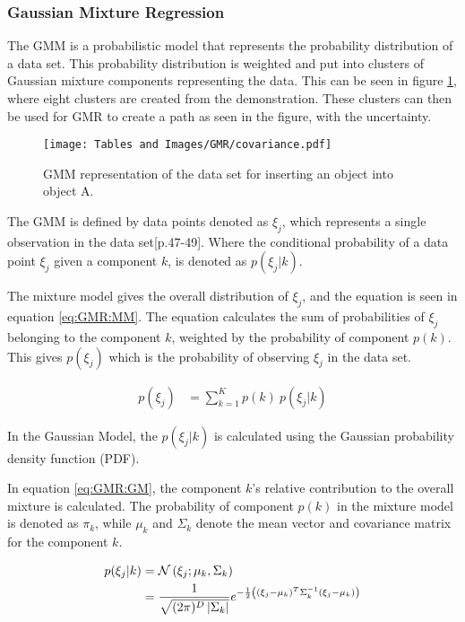 \subsubsection{Gaussian Mixture Regression}\label{sec:GMM}
The GMM is a probabilistic model that represents the probability distribution of a data set.
This probability distribution is weighted and put into clusters of Gaussian mixture components representing the data.
This can be seen in figure \ref{fig:GMR:covariance}, where eight clusters are created from the demonstration. 
These clusters can then be used for GMR to create a path as seen in the figure, with the uncertainty.

\begin{figure}[!htb]
    \centering
    \texttt{[image: Tables and Images/GMR/covariance.pdf]}
    \caption{GMM representation of the data set for inserting an object into object A.}
    \label{fig:GMR:covariance}
\end{figure}

The GMM is defined by data points denoted as $\xi_j$, which represents a single observation in the data set\cite{SelfStudy}[p.47-49]. Where the conditional probability of a data point $\xi_j$ given a component $k$, is denoted as $p(\xi_j | k)$.

The mixture model gives the overall distribution of $\xi_j$, and the equation is seen in equation \ref{eq:GMR:MM}. The equation calculates the sum of probabilities of $\xi_j$ belonging to the component $k$, weighted by the probability of component $p(k)$. This gives $p(\xi_j)$ which is the probability of observing $\xi_j$ in the data set. 


\begin{align}
    p(\xi_j) &= \sum_{k=1}^{K} p(k) ~ p(\xi_j | k) \label{eq:GMR:MM}
\end{align}

\vspace{1em}

In the Gaussian Model, the $p(\xi_j | k)$ is calculated using the Gaussian probability 
density function (PDF). 

In equation \ref{eq:GMR:GM}, the component $k$'s relative contribution to the overall mixture is calculated. The probability of component $p(k)$ in the mixture model is denoted as $\pi_k$, while $\mu_k$ and $\Sigma_k$ denote the mean vector and covariance matrix for the component $k$.

\begin{align}
    p(\xi_j | k) &= \mathcal{N} \left( \xi_{j}; \mu_{k}, \Sigma_k \right) \notag \\
    &= \frac{1}{\sqrt{(2\pi)^D \left\lvert \Sigma_k \right\rvert}} e^{-\frac{1}{2}\left( (\xi_j - \mu_k)^T \Sigma_{k}^{-1} (\xi_j - \mu_k) \right)} \label{eq:GMR:GM}
\end{align}

